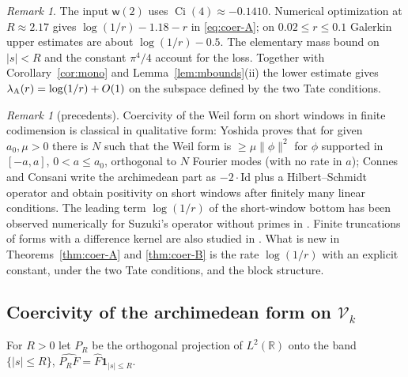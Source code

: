 \documentclass[11pt]{amsart}
\theoremstyle{definition}
\theoremstyle{remark}
\newtheorem{remark}[theorem]{Remark}
\newcommand{\R}{\mathbb R}
\newcommand{\Fh}{\widehat F}
\begin{document}
\begin{remark}\label{rem:coer-A}
The input $\mathsf w(2)$ uses $\operatorname{Ci}(4)\approx-0.1410$.
Numerical optimization at $R\approx2.17$ gives
$\log(1/r)-1.18-r$ in \eqref{eq:coer-A}; on $0.02\le r\le0.1$
Galerkin upper estimates are about $\log(1/r)-0.5$. The elementary
mass bound on $|s|<R$ and the constant $\pi^4/4$ account for the loss.
Together with Corollary~\ref{cor:mono} and Lemma~\ref{lem:mbounds}(ii)
the lower estimate gives $\lambda_{\rm A}(r)=\log(1/r)+O(1)$
on the subspace defined by the two Tate conditions.
\end{remark}

\begin{remark}[precedents]\label{rem:coer-prec}
Coercivity of the Weil form on short windows in finite codimension is classical in qualitative form: Yoshida
\cite[Lemma~3]{Yoshida1992} proves that for given $a_0,\mu>0$ there is $N$ such that the Weil form is $\ge\mu\|\phi\|^2$ for
$\phi$ supported in $[-a,a]$, $0<a\le a_0$, orthogonal to $N$ Fourier modes (with no rate in $a$); Connes and Consani
\cite[Thm.~3.6, Cor.~3.8, Rem.~3.9]{ConnesConsani2021} write the archimedean part as $-2\cdot\mathrm{Id}$ plus a
Hilbert--Schmidt operator and obtain positivity on short windows after finitely many linear conditions. The leading
term $\log(1/r)$ of the short-window bottom has been observed numerically for Suzuki's operator without primes in
\cite{Kim2026}. Finite truncations of forms with a difference kernel are also studied in \cite{CvS2025}. What is new in
Theorems~\ref{thm:coer-A} and \ref{thm:coer-B} is the rate $\log(1/r)$ with an explicit constant, under the two Tate
conditions, and the block structure.
\end{remark}


\subsection{Coercivity of the archimedean form on $\mathcal V_k$}\label{subsec:coer-B}
For $R>0$ let $P_R$ be the orthogonal projection of $L^2(\R)$ onto the band $\{|s|\le R\}$,
$\widehat{P_RF}=\Fh\mathbf 1_{|s|\le R}$.
\end{document}
